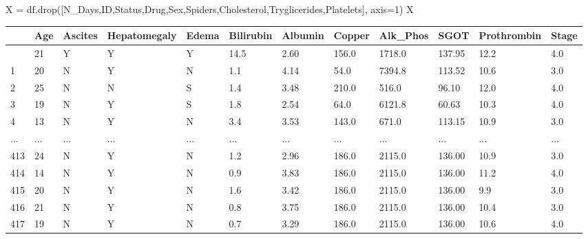 \documentclass[
  letterpaper,
]{krantz}
\makeatletter
\newenvironment{Shaded}{\begin{snugshade}}{\end{snugshade}}
\newcommand{\DecValTok}[1]{\textcolor[rgb]{0.68,0.00,0.00}{#1}}
\newcommand{\NormalTok}[1]{\textcolor[rgb]{0.00,0.23,0.31}{#1}}
\newcommand{\OperatorTok}[1]{\textcolor[rgb]{0.37,0.37,0.37}{#1}}
\newcommand{\StringTok}[1]{\textcolor[rgb]{0.13,0.47,0.30}{#1}}
\newenvironment{kframe}{%
\medskip{}
\setlength{\fboxsep}{.8em}
 \def\at@end@of@kframe{}%
 \ifinner\ifhmode%
  \def\at@end@of@kframe{\end{minipage}}%
  \begin{minipage}{\columnwidth}%
 \fi\fi%
 \def\FrameCommand##1{\hskip\@totalleftmargin \hskip-\fboxsep
 \colorbox{shadecolor}{##1}\hskip-\fboxsep
     \hskip-\linewidth \hskip-\@totalleftmargin \hskip\columnwidth}%
 \MakeFramed {\advance\hsize-\width
   \@totalleftmargin\z@ \linewidth\hsize
   \@setminipage}}%
 {\par\unskip\endMakeFramed%
 \at@end@of@kframe}
\renewenvironment{Shaded}{\begin{kframe}}{\end{kframe}}
\makeatother
\begin{document}
\begin{Shaded}
\begin{Highlighting}[]
\NormalTok{X }\OperatorTok{=}\NormalTok{ df.drop([}\StringTok{\textquotesingle{}N\_Days\textquotesingle{}}\NormalTok{,}\StringTok{\textquotesingle{}ID\textquotesingle{}}\NormalTok{,}\StringTok{\textquotesingle{}Status\textquotesingle{}}\NormalTok{,}\StringTok{\textquotesingle{}Drug\textquotesingle{}}\NormalTok{,}\StringTok{\textquotesingle{}Sex\textquotesingle{}}\NormalTok{,}\StringTok{\textquotesingle{}Spiders\textquotesingle{}}\NormalTok{,}\StringTok{\textquotesingle{}Cholesterol\textquotesingle{}}\NormalTok{,}\StringTok{\textquotesingle{}Tryglicerides\textquotesingle{}}\NormalTok{,}\StringTok{\textquotesingle{}Platelets\textquotesingle{}}\NormalTok{], axis}\OperatorTok{=}\DecValTok{1}\NormalTok{)}
\NormalTok{X}
\end{Highlighting}
\end{Shaded}

\begin{longtable}[]{@{}llllllllllll@{}}
\toprule\noalign{}
& Age & Ascites & Hepatomegaly & Edema & Bilirubin & Albumin & Copper &
Alk\_Phos & SGOT & Prothrombin & Stage \\
\midrule\noalign{}
\endhead
\bottomrule\noalign{}
\endlastfoot
0 & 21 & Y & Y & Y & 14.5 & 2.60 & 156.0 & 1718.0 & 137.95 & 12.2 &
4.0 \\
1 & 20 & N & Y & N & 1.1 & 4.14 & 54.0 & 7394.8 & 113.52 & 10.6 & 3.0 \\
2 & 25 & N & N & S & 1.4 & 3.48 & 210.0 & 516.0 & 96.10 & 12.0 & 4.0 \\
3 & 19 & N & Y & S & 1.8 & 2.54 & 64.0 & 6121.8 & 60.63 & 10.3 & 4.0 \\
4 & 13 & N & Y & N & 3.4 & 3.53 & 143.0 & 671.0 & 113.15 & 10.9 & 3.0 \\
... & ... & ... & ... & ... & ... & ... & ... & ... & ... & ... & ... \\
413 & 24 & N & Y & N & 1.2 & 2.96 & 186.0 & 2115.0 & 136.00 & 10.9 &
3.0 \\
414 & 14 & N & Y & N & 0.9 & 3.83 & 186.0 & 2115.0 & 136.00 & 11.2 &
4.0 \\
415 & 20 & N & Y & N & 1.6 & 3.42 & 186.0 & 2115.0 & 136.00 & 9.9 &
3.0 \\
416 & 21 & N & Y & N & 0.8 & 3.75 & 186.0 & 2115.0 & 136.00 & 10.4 &
3.0 \\
417 & 19 & N & Y & N & 0.7 & 3.29 & 186.0 & 2115.0 & 136.00 & 10.6 &
4.0 \\
\end{longtable}
\end{document}
